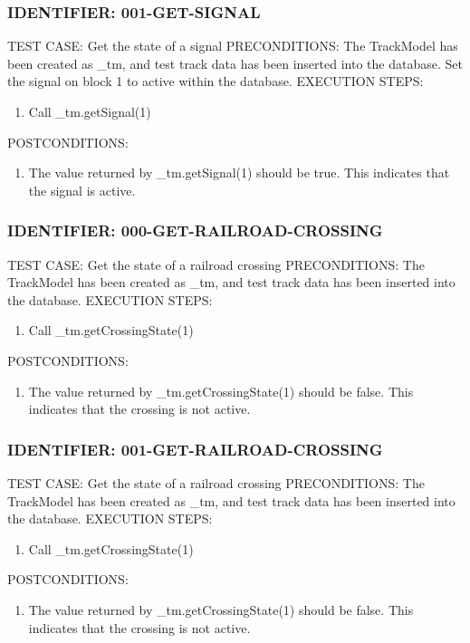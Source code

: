 \documentclass{scrreprt}
\begin{document}
\subsubsection{IDENTIFIER: 001-GET-SIGNAL}
TEST CASE: Get the state of a signal
PRECONDITIONS: The TrackModel has been created as _tm, and test track data has been inserted into the database. Set the signal on block 1 to active within the database.
EXECUTION STEPS:
\begin{enumerate}
	\item Call _tm.getSignal(1)
\end{enumerate}
POSTCONDITIONS:
\begin{enumerate}
	\item The value returned by _tm.getSignal(1) should be true. This indicates that the signal is active.
\end{enumerate}

\subsubsection{IDENTIFIER: 000-GET-RAILROAD-CROSSING}
TEST CASE: Get the state of a railroad crossing
PRECONDITIONS: The TrackModel has been created as _tm, and test track data has been inserted into the database.
EXECUTION STEPS:
\begin{enumerate}
	\item Call _tm.getCrossingState(1)
\end{enumerate}
POSTCONDITIONS:
\begin{enumerate}
	\item The value returned by _tm.getCrossingState(1) should be false. This indicates that the crossing is not active.
\end{enumerate}

\subsubsection{IDENTIFIER: 001-GET-RAILROAD-CROSSING}
TEST CASE: Get the state of a railroad crossing
PRECONDITIONS: The TrackModel has been created as _tm, and test track data has been inserted into the database.
EXECUTION STEPS:
\begin{enumerate}
	\item Call _tm.getCrossingState(1)
\end{enumerate}
POSTCONDITIONS:
\begin{enumerate}
	\item The value returned by _tm.getCrossingState(1) should be false. This indicates that the crossing is not active.
\end{enumerate}
\end{document}
